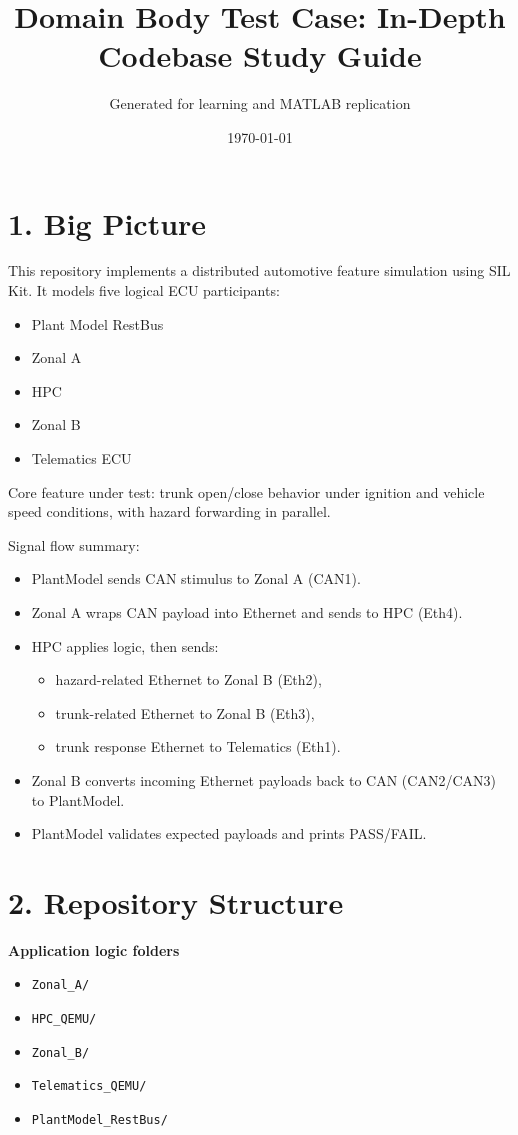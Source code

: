 \documentclass[11pt,a4paper]{article}
\title{Domain Body Test Case: In-Depth Codebase Study Guide}
\author{Generated for learning and MATLAB replication}
\date{\today}
\begin{document}
\maketitle

\section*{1. Big Picture}
This repository implements a distributed automotive feature simulation using SIL Kit.
It models five logical ECU participants:
\begin{itemize}
  \item Plant Model RestBus
  \item Zonal A
  \item HPC
  \item Zonal B
  \item Telematics ECU
\end{itemize}

Core feature under test: trunk open/close behavior under ignition and vehicle speed conditions, with hazard forwarding in parallel.

Signal flow summary:
\begin{itemize}
  \item PlantModel sends CAN stimulus to Zonal A (CAN1).
  \item Zonal A wraps CAN payload into Ethernet and sends to HPC (Eth4).
  \item HPC applies logic, then sends:
  \begin{itemize}
    \item hazard-related Ethernet to Zonal B (Eth2),
    \item trunk-related Ethernet to Zonal B (Eth3),
    \item trunk response Ethernet to Telematics (Eth1).
  \end{itemize}
  \item Zonal B converts incoming Ethernet payloads back to CAN (CAN2/CAN3) to PlantModel.
  \item PlantModel validates expected payloads and prints PASS/FAIL.
\end{itemize}

\section*{2. Repository Structure}
\textbf{Application logic folders}
\begin{itemize}
  \item \texttt{Zonal\_A/}
  \item \texttt{HPC\_QEMU/}
  \item \texttt{Zonal\_B/}
  \item \texttt{Telematics\_QEMU/}
  \item \texttt{PlantModel\_RestBus/}
\end{itemize}
\end{document}
